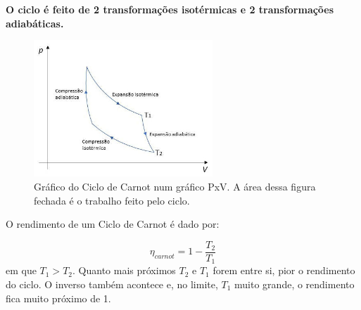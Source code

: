 \documentclass[12pt]{extarticle}
\newcommand{\<}{\langle}
\renewcommand{\>}{\rangle}
\theoremstyle{definition}
\begin{document}
\textbf{O ciclo é feito de 2 transformações isotérmicas e 2 transformações adiabáticas.}

\begin{figure}[h]
    \centering
    \includegraphics[width=0.6\textwidth]{graficociclocarnot.jpg}
    \caption{Gráfico do Ciclo de Carnot num gráfico PxV. A área dessa figura fechada é o trabalho feito pelo ciclo.}
    \label{fig:carnot}
\end{figure}

O rendimento de um Ciclo de Carnot é dado por:

\begin{equation}
    \eta_{carnot} = 1 -\frac{T_2}{T_1}
\end{equation}
\noindent em que $T_1>T_2$. Quanto mais próximos $T_2$ e $T_1$ forem entre si, pior o rendimento do ciclo. O inverso também acontece e, no limite, $T_1$ muito grande, o rendimento fica muito próximo de 1.
\end{document}
